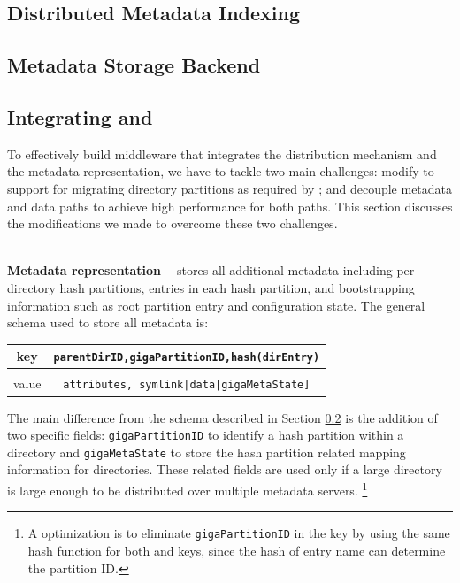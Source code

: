 \subsection{Distributed Metadata Indexing}
\label{design.giga}


\subsection{Metadata Storage Backend}
\label{design.tablefs}


\subsection{Integrating \giga{} and \tfs{}}
\label{design.integration}

To effectively build \sys middleware that integrates
the \giga distribution mechanism and the \tfs metadata representation,
we have to tackle two main challenges:
modify \tfs to support for
migrating directory partitions as required by \giga;
and decouple metadata and data paths to
achieve high performance for both paths.
This section discusses the modifications we made to
overcome these two challenges.


~\\
\textbf{Metadata representation -- }
\tfs stores all additional metadata including \giga per-directory hash
partitions, entries in each hash partition, and \giga
bootstrapping information such as root partition entry
and \giga configuration state.
The general schema used to store all metadata is:

\begin{table}[!htc]
\vspace{10pt}
\begin{tabular}{c|c}
key & \texttt{parentDirID,gigaPartitionID,hash(dirEntry)} \\
\midrule \\
value & \texttt{attributes, symlink|data|gigaMetaState]} \\
\end{tabular}
\label{tab:keyschema}
\end{table}

The main difference from the \tfs schema described in Section
\ref{design.tablefs} is the addition of two \giga specific fields:
\texttt{gigaPartitionID} to identify a
\giga hash partition within a directory and \texttt{gigaMetaState} to store the
hash partition related mapping information for directories.
These \giga related fields are used only
if a large directory is large enough to be
distributed over multiple metadata servers.
\footnote{A optimization is to eliminate \texttt{gigaPartitionID} in the key
by using the same hash function for both \giga and \tfs keys,
since the hash of entry name can determine the partition ID.}

